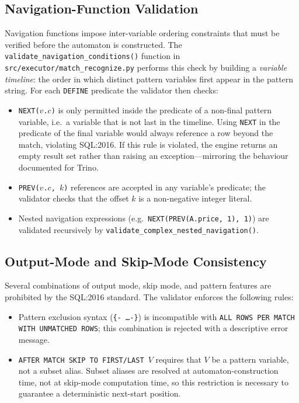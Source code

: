 \subsection{Navigation-Function Validation}
\label{subsec:sem-navfunc}

Navigation functions impose inter-variable ordering constraints that
must be verified before the automaton is constructed.  The
\texttt{validate\_navigation\_conditions()} function in
\texttt{src/executor/match\_recognize.py} performs this check by
building a \emph{variable timeline}: the order in which distinct
pattern variables first appear in the pattern string.  For each
\texttt{DEFINE} predicate the validator then checks:

\begin{itemize}
  \item \texttt{NEXT($v$.$c$)} is only permitted inside the
    predicate of a non-final pattern variable, i.e.\ a variable
    that is not last in the timeline.  Using \texttt{NEXT} in the
    predicate of the final variable would always reference a row
    beyond the match, violating SQL:2016.  If this rule is
    violated, the engine returns an empty result set rather than
    raising an exception---mirroring the behaviour documented for
    Trino.

  \item \texttt{PREV($v$.$c$, $k$)} references are accepted in any
    variable's predicate; the validator checks that the offset $k$
    is a non-negative integer literal.

  \item Nested navigation expressions (e.g.\
    \texttt{NEXT(PREV(A.price, 1), 1)}) are validated recursively
    by \texttt{validate\_complex\_nested\_navigation()}.
\end{itemize}

\subsection{Output-Mode and Skip-Mode Consistency}
\label{subsec:sem-modes}

Several combinations of output mode, skip mode, and pattern
features are prohibited by the SQL:2016 standard.  The validator
enforces the following rules:

\begin{itemize}
  \item Pattern exclusion syntax (\texttt{\{- \ldots -\}}) is
    incompatible with \texttt{ALL ROWS PER MATCH WITH UNMATCHED
    ROWS}; this combination is rejected with a descriptive error
    message.

  \item \texttt{AFTER MATCH SKIP TO FIRST/LAST $V$} requires that
    $V$ be a pattern variable, not a subset alias.  Subset aliases
    are resolved at automaton-construction time, not at skip-mode
    computation time, so this restriction is necessary to guarantee
    a deterministic next-start position.
\end{itemize}

